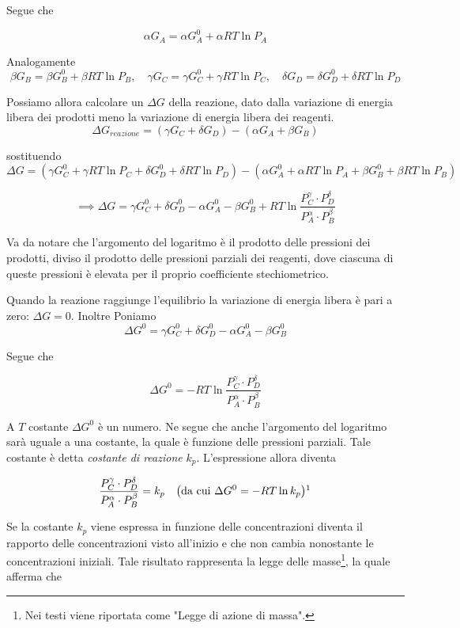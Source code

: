 Segue che

$$ \alpha G_A = \alpha G_A^0  + \alpha RT \ln P_A$$

Analogamente
$$\beta G_B = \beta G_B^0  + \beta RT \ln P_B,
\quad
\gamma G_C = \gamma G_C^0  + \gamma RT \ln P_C,
\quad
\delta G_D = \delta G_D^0  + \delta RT \ln P_D$$

Possiamo allora calcolare un $\Delta G$ della reazione, dato dalla variazione di energia libera dei prodotti meno la variazione di energia libera dei reagenti.
$$\Delta G_{reazione} = (\gamma G_C + \delta G_D) - (\alpha G_A + \beta G_B)$$

sostituendo
$$\Delta G = (\gamma G_C^0  + \gamma RT \ln P_C + \delta G_D^0  + \delta RT \ln P_D) - 
(\alpha G_A^0  + \alpha RT \ln P_A + \beta G_B^0  + \beta RT \ln P_B)$$

$$\implies \Delta G = \gamma G_C^0 + \delta G_D^0 - \alpha G_A^0 - \beta G_B^0 + RT \ln \frac{P_C^{\gamma} \cdot P_D^{\delta}}{P_A^{\alpha} \cdot P_B^{\beta}}$$

Va da notare che l'argomento del logaritmo è il prodotto delle pressioni dei prodotti, diviso il prodotto delle pressioni parziali dei reagenti, dove ciascuna di queste pressioni è elevata per il proprio coefficiente stechiometrico.

Quando la reazione raggiunge l'equilibrio la variazione di energia libera è pari a zero: $\Delta G = 0$. Inoltre Poniamo
$$\Delta G^0 = \gamma G_C^0 + \delta G_D^0 - \alpha G_A^0 - \beta G_B^0 $$

Segue che

$$\Delta G^0 = -RT \ln \frac{P_C^{\gamma} \cdot P_D^{\delta}}{P_A^{\alpha} \cdot P_B^{\beta}}$$

A $T$ costante $\Delta G^0$ è un numero. Ne segue che anche l'argomento del logaritmo sarà uguale a una costante, la quale è funzione delle pressioni parziali. Tale costante è detta \textit{costante di reazione} $k_p$. L'espressione allora diventa

$$\frac{P_C^{\gamma} \cdot P_D^{\delta}}{P_A^{\alpha} \cdot P_B^{\beta}} = k_p
\quad\big(\text{da cui }
\Delta G^0 = -RT\ln k_p\big)\footnotemark$$


Se la costante $k_p$ viene espressa in funzione delle concentrazioni diventa il rapporto delle concentrazioni visto all'inizio e che non cambia nonostante le concentrazioni iniziali. Tale risultato rappresenta la legge delle masse\footnote{Nei testi viene riportata come "Legge di azione di massa".}, la quale afferma che

